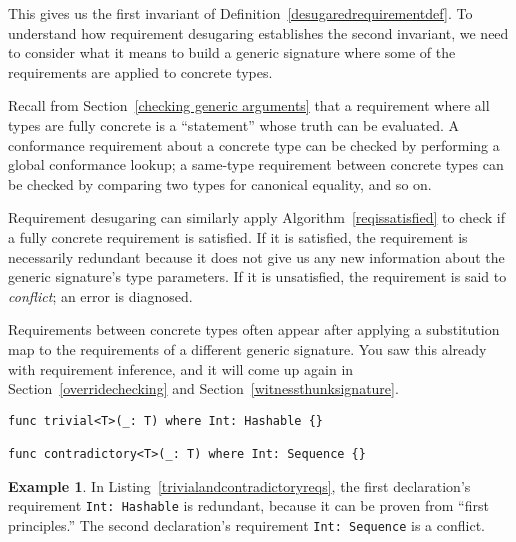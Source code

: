\documentclass[a4paper,headsepline,bibliography=totoc,toc=flat,fleqn,twoside=semi]{scrbook}
\theoremstyle{definition}
\theoremstyle{definition}
\newtheorem{example}{Example}[chapter]
\theoremstyle{definition}
\begin{document}
This gives us the first invariant of Definition~\ref{desugaredrequirementdef}. To understand how requirement desugaring establishes the second invariant, we need to consider what it means to build a generic signature where some of the requirements are applied to concrete types.

Recall from Section~\ref{checking generic arguments} that a requirement where all types are fully concrete is a ``statement'' whose truth can be evaluated. A conformance requirement about a concrete type can be checked by performing a global conformance lookup; a same-type requirement between concrete types can be checked by comparing two types for canonical equality, and so on.

Requirement desugaring can similarly apply Algorithm~\ref{reqissatisfied} to check if a fully concrete requirement is satisfied. If it is satisfied, the requirement is necessarily redundant because it does not give us any new information about the generic signature's type parameters. If it is unsatisfied, the requirement is said to \emph{conflict}; an error is diagnosed.

Requirements between concrete types often appear after applying a substitution map to the requirements of a different generic signature. You saw this already with requirement inference, and it will come up again in Section~\ref{overridechecking} and Section~\ref{witnessthunksignature}.
\begin{listing}\label{trivialandcontradictoryreqs}
\begin{Verbatim}
func trivial<T>(_: T) where Int: Hashable {}

func contradictory<T>(_: T) where Int: Sequence {}
\end{Verbatim}
\end{listing}
\begin{example}
In Listing~\ref{trivialandcontradictoryreqs}, the first declaration's requirement \texttt{Int:\ Hashable} is redundant, because it can be proven from ``first principles.'' The second declaration's requirement \texttt{Int:\ Sequence} is a conflict.
\end{example}
\end{document}
